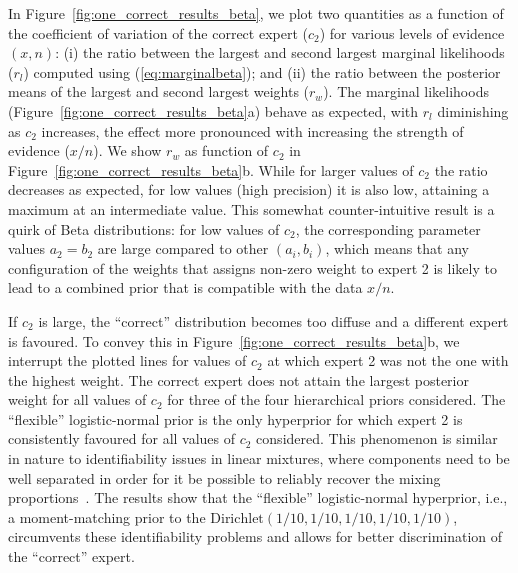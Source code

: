 \documentclass[a4paper, notitlepage, 11pt]{article}
\begin{document}
In Figure~\ref{fig:one_correct_results_beta}, we plot two quantities as a function of the coefficient of variation of the correct expert ($c_2$) for various levels of evidence $(x, n)$: (i) the ratio between the largest and second largest marginal likelihoods ($r_l$)  computed using (\ref{eq:marginalbeta}); and (ii) the ratio between the posterior means of the largest and second largest weights ($r_w$).
The marginal likelihoods (Figure~\ref{fig:one_correct_results_beta}a) behave as expected, with $r_l$ diminishing as $c_2$ increases, the effect more pronounced with increasing the strength of evidence ($x/n$).
We show $r_w$ as function of $c_2$ in Figure~\ref{fig:one_correct_results_beta}b.
While for larger values of $c_2$ the ratio decreases as expected, for low values (high precision) it is also low, attaining a maximum at an intermediate value.
This somewhat counter-intuitive result is a quirk of Beta distributions: for low values of $c_2$, the corresponding parameter values $a_2 = b_2$ are large compared to other $(a_i, b_i)$, which means that any configuration of the weights that assigns non-zero weight to expert 2 is likely to lead to a combined prior that is compatible with the data $x/n$.

If $c_2$ is large, the ``correct'' distribution becomes too diffuse and a different expert is favoured.
To convey this in Figure~\ref{fig:one_correct_results_beta}b, we interrupt the plotted lines for values of $c_2$ at which expert 2 was not the one with the highest weight.
The correct expert does not attain the largest posterior weight for all values of $c_2$ for three of the four hierarchical priors considered. 
The ``flexible'' logistic-normal prior is the only hyperprior for which expert 2 is consistently favoured for all values of $c_2$ considered.
This phenomenon is similar in nature to identifiability issues in linear mixtures, where components need to be well separated in order for it be possible to reliably recover the mixing proportions~\citep{Yakowitz1968}. 
The results show that the ``flexible'' logistic-normal hyperprior, i.e., a moment-matching prior to the $\text{Dirichlet}(1/10, 1/10, 1/10, 1/10, 1/10)$, circumvents these identifiability problems and allows for better discrimination of the ``correct'' expert.
\end{document}
